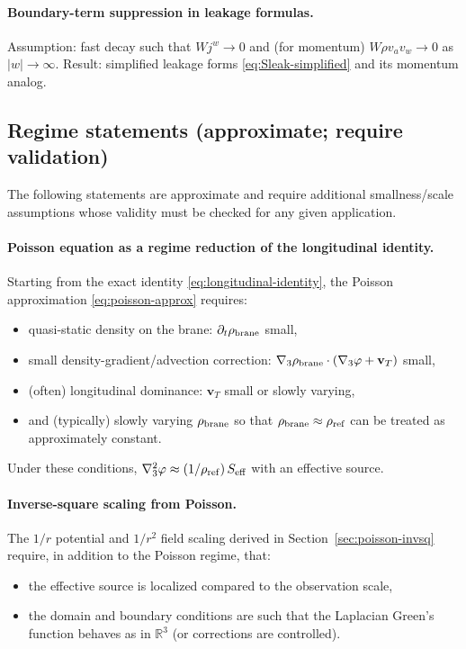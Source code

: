 \documentclass[11pt]{article}
\newcommand{\rhoref}{\rho_{\rm ref}}
\begin{document}
\paragraph{Boundary-term suppression in leakage formulas.}
Assumption: fast decay such that $Wj^w\to 0$ and (for momentum) $W\rho v_a v_w\to 0$ as $|w|\to\infty$. Result: simplified leakage forms \eqref{eq:Sleak-simplified} and its momentum analog.

\subsection{Regime statements (approximate; require validation)}
\label{app:claims-regime}

The following statements are approximate and require additional smallness/scale assumptions whose validity must be checked for any given application.

\paragraph{Poisson equation as a regime reduction of the longitudinal identity.}
Starting from the exact identity \eqref{eq:longitudinal-identity}, the Poisson approximation \eqref{eq:poisson-approx} requires:
\begin{itemize}[leftmargin=2.0em]
\item quasi-static density on the brane: $\partial_t\rho_{\rm brane}$ small,
\item small density-gradient/advection correction: $\nabla_3\rho_{\rm brane}\cdot(\nabla_3\varphi+\mathbf{v}_T)$ small,
\item (often) longitudinal dominance: $\mathbf{v}_T$ small or slowly varying,
\item and (typically) slowly varying $\rho_{\rm brane}$ so that $\rho_{\rm brane}\approx\rhoref$ can be treated as approximately constant.
\end{itemize}
Under these conditions, $\nabla_3^2\varphi \approx (1/\rhoref)\,S_{\rm eff}$ with an effective source.

\paragraph{Inverse-square scaling from Poisson.}
The $1/r$ potential and $1/r^2$ field scaling derived in Section~\ref{sec:poisson-invsq} require, in addition to the Poisson regime, that:
\begin{itemize}[leftmargin=2.0em]
\item the effective source is localized compared to the observation scale,
\item the domain and boundary conditions are such that the Laplacian Green's function behaves as in $\mathbb{R}^3$ (or corrections are controlled).
\end{itemize}
\end{document}
